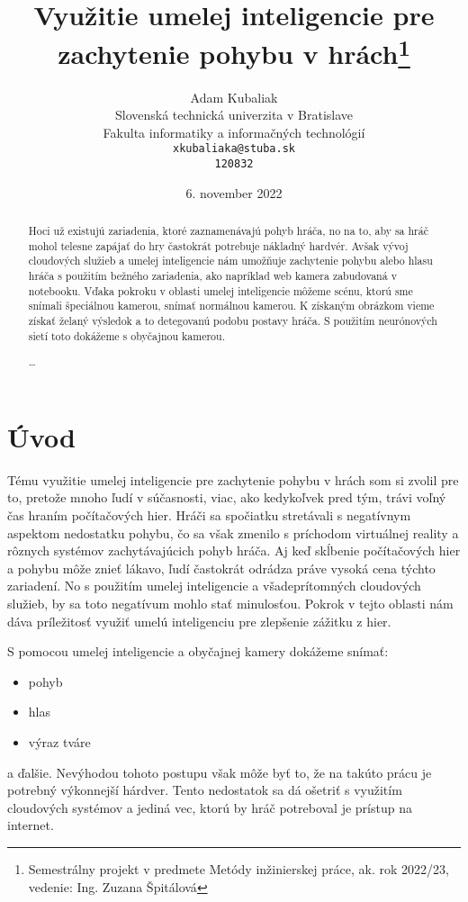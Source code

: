 \documentclass[10pt,twoside,slovak,coursepaper]{article}
\title{Využitie umelej inteligencie pre zachytenie pohybu v hrách\thanks{Semestrálny projekt v predmete Metódy inžinierskej práce, ak. rok 2022/23, vedenie: Ing. Zuzana Špitálová}}
\author{Adam Kubaliak\\[2pt]
	{\small Slovenská technická univerzita v Bratislave}\\
	{\small Fakulta informatiky a informačných technológií}\\
	{\small \texttt{xkubaliaka@stuba.sk}}\\
	{\small \texttt{120832}}
	}
\date{\small 6. november 2022}
\begin{document}
\maketitle
\clearpage

\tableofcontents
\clearpage

\begin{abstract} %
Hoci už existujú zariadenia, ktoré zaznamenávajú pohyb hráča, no na to, aby sa hráč mohol telesne zapájať do hry častokrát potrebuje nákladný hardvér. Avšak vývoj cloudových služieb a umelej inteligencie nám umožňuje zachytenie pohybu alebo hlasu hráča s použitím bežného zariadenia, ako napríklad web kamera zabudovaná v notebooku. Vďaka pokroku v oblasti umelej inteligencie môžeme scénu, ktorú sme snímali špeciálnou kamerou, snímať normálnou kamerou. K získaným obrázkom vieme získať želaný výsledok a to detegovanú podobu postavy hráča. S použitím neurónových sietí toto dokážeme s obyčajnou kamerou. 

\ldots
\end{abstract}
\clearpage

\section{Úvod}
Tému využitie umelej inteligencie pre zachytenie pohybu v hrách som si zvolil pre to, pretože mnoho ľudí v súčasnosti, viac, ako kedykoľvek pred tým, trávi voľný čas hraním počítačových hier. Hráči sa spočiatku stretávali s negatívnym aspektom nedostatku pohybu, čo sa však zmenilo s príchodom virtuálnej reality a rôznych systémov zachytávajúcich pohyb hráča. Aj keď skĺbenie počítačových hier a pohybu môže znieť lákavo, ľudí častokrát odrádza práve vysoká cena týchto zariadení. No s použitím umelej inteligencie a všadeprítomných cloudových služieb, by sa toto negatívum mohlo stať minulosťou. Pokrok v tejto oblasti nám dáva príležitosť využiť umelú inteligenciu pre zlepšenie zážitku z hier. 


S pomocou umelej inteligencie a obyčajnej kamery dokážeme snímať:
\begin{itemize}
\item pohyb 
\item hlas
\item výraz tváre

\end{itemize}
a ďalšie. Nevýhodou tohoto postupu však môže byť to, že na takúto prácu je potrebný výkonnejší hárdver. Tento nedostatok sa dá ošetriť s využitím cloudových systémov a jediná vec, ktorú by hráč potreboval je prístup na internet.
\end{document}
